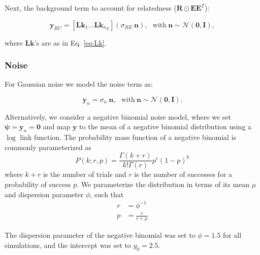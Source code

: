 Next, the background term to account for relatedness ($\mathbf{R} \odot \mathbf{E}\mathbf{E}^T$):

\begin{equation}
  \mathbf{y}_{RC} = [\mathbf{Lk}_1 ... \mathbf{Lk}_{n_E}] (\sigma_{RE} \ \mathbf{n}), ~~~ \mathrm{with} \ \mathbf{n} \sim \mathcal{N}(\mathbf{0},\mathbf{I}),
\end{equation}



where $\mathbf{Lk}$'s are as in Eq. \eqref{eq:Lk}.

\subsubsection{Noise}\label{sec:noise}

For Gaussian noise we model the noise term as:

\begin{equation}
   \mathbf{y}_{n} = \sigma_n \ \mathbf{n}, ~~~ \mathrm{with} \ \mathbf{n} \sim \mathcal{N}(\mathbf{0},\mathbf{I}).
\end{equation}

Alternatively, we consider a negative binomial noise model, where we set $\boldsymbol{\psi}=\mathbf{y}_n=\mathbf{0}$ and map $\mathbf{y}$ to the mean of a negative binomial distribution using a $\log$ link function. The probability mass function of a negative binomial is commonly parameterized as
\begin{equation}
    P(k; r,p)=\frac{\Gamma(k+r)}{k!\Gamma(r)}p^r(1-p)^k
\end{equation}
where $k+r$ is the number of trials and $r$ is the number of successes for a probability of success $p$. We parameterize the distribution in terms of its mean $\mu$ and dispersion parameter $\phi$, such that
\begin{align}
    r&=\phi^{-1} \\
    p&=\frac{r}{r+\mu}
\end{align}

The dispersion parameter of the negative binomial was set to $\phi=1.5$ for all simulations, and the intercept was set to $y_0=2.5$.

